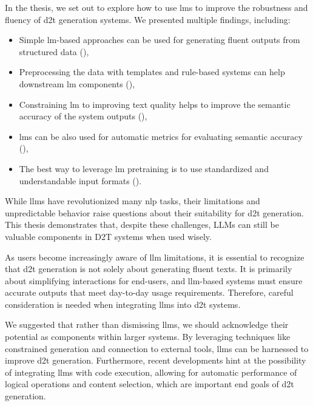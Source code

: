 \documentclass[12pt,notitlepage,a4paper,oneside,openany]{report}
\begin{document}
In the thesis, we set out to explore how to use \acp{lm} to improve the robustness and fluency of \ac{d2t} generation systems. We presented multiple findings, including:
\begin{itemize}
    \item Simple \ac{lm}-based approaches can be used for generating fluent outputs from structured data (),
    \item Preprocessing the data with templates and rule-based systems can help downstream \ac{lm} components (),
    \item Constraining \ac{lm} to improving text quality helps to improve the semantic accuracy of the system outputs (),
    \item \acp{lm} can be also used for automatic metrics for evaluating semantic accuracy (),
    \item The best way to leverage \ac{lm} pretraining is to use standardized and understandable input formats ().
\end{itemize}

While \acp{llm} have revolutionized many \ac{nlp} tasks, their limitations and unpredictable behavior raise questions about their suitability for \ac{d2t} generation. This thesis demonstrates that, despite these challenges, LLMs can still be valuable components in D2T systems when used wisely.

As users become increasingly aware of \ac{llm} limitations, it is essential to recognize that \ac{d2t} generation is not solely about generating fluent texts. It is primarily about simplifying interactions for end-users, and \ac{llm}-based systems must ensure accurate outputs that meet day-to-day usage requirements. Therefore, careful consideration is needed when integrating \acp{llm} into \ac{d2t} systems.

We suggested that rather than dismissing \acp{llm}, we should acknowledge their potential as components within larger systems. By leveraging techniques like constrained generation and connection to external tools, \acp{llm} can be harnessed to improve \ac{d2t} generation. Furthermore, recent developments hint at the possibility of integrating \acp{llm} with code execution, allowing for automatic performance of logical operations and content selection, which are important end goals of \ac{d2t} generation.
\end{document}
